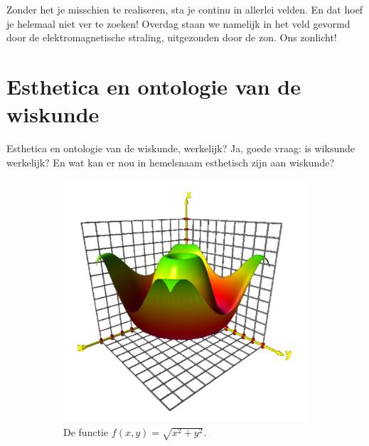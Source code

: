 \documentclass{article}      %
\begin{document}
Zonder het je misschien te realiseren, sta je continu in allerlei velden.
En dat hoef je helemaal niet ver te zoeken! Overdag staan we namelijk in 
het veld gevormd door de elektromagnetische straling, uitgezonden door de zon.
Ons zonlicht!

\section{Esthetica en ontologie van de wiskunde}

Esthetica en ontologie van de wiskunde, werkelijk? Ja, goede vraag: is
wiksunde werkelijk? En wat kan er nou in hemelsnaam esthetisch 
zijn aan wiskunde? 

\begin{figure}[h!]
  \centering
  \begin{subfigure}[b]{0.49\linewidth}
    \includegraphics[width=\linewidth]{images/3d_plot.png}
    \caption{De functie $f(x, y) = \sqrt{x^2 + y^2}$.}
  \end{subfigure}
  \begin{subfigure}[b]{0.49\linewidth}

\end{subfigure}
\end{figure}
\end{document}
